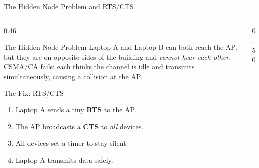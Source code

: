 \documentclass[aspectratio=169]{beamer}
\begin{document}
\begin{frame}{The Hidden Node Problem and RTS/CTS}
    \begin{columns}[T]
        \begin{column}{0.46\textwidth}
            \begin{block}{The Hidden Node Problem}
                \footnotesize
                Laptop A and Laptop B can both reach the AP, but they are on opposite sides of the building and \emph{cannot hear each other}. CSMA/CA fails: each thinks the channel is idle and transmits simultaneously, causing a collision at the AP.
            \end{block}
            \vspace{0.3em}
            \begin{block}{The Fix: RTS/CTS}
                \footnotesize
                \begin{enumerate}
                    \item Laptop A sends a tiny \textbf{RTS} to the AP.
                    \item The AP broadcasts a \textbf{CTS} to \emph{all} devices.
                    \item All devices set a  timer to stay silent.
                    \item Laptop A transmits data safely.
                \end{enumerate}
            \end{block}
        \end{column}
        \begin{column}{0.50\textwidth}
            \begin{center}
\end{center}
\end{column}
\end{columns}
\end{frame}
\end{document}
